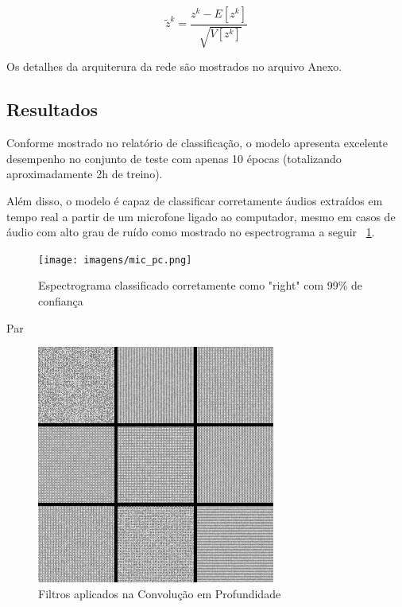 \documentclass{bmvc2k}
\begin{document}
\begin{equation}
\tilde z ^k = \frac{z^k - E[z^k]}{\sqrt[]{V[z^k]}}
\end{equation}

Os detalhes da arquiterura da rede são mostrados no arquivo Anexo.

\subsection*{Resultados}

Conforme mostrado no relatório de classificação, o modelo apresenta excelente
desempenho no conjunto de teste com apenas 10 épocas (totalizando
aproximadamente 2h de treino).

Além disso, o modelo é capaz de classificar corretamente áudios extraídos em
tempo real a partir de um microfone ligado ao computador, mesmo em casos
de áudio com alto grau de ruído como mostrado no espectrograma a seguir ~\ref{audio_mic}.

\begin{figure}[ht]
\centering
\texttt{[image: imagens/mic\_pc.png]} 
\caption{Espectrograma classificado corretamente como "right" com 99\% de confiança}
\label{audio_mic}
\end{figure}

Par

\begin{figure}[ht]
\centering
\includegraphics[scale=0.5]{imagens/stitched_filters_3x3.png} 
\caption{Filtros aplicados na Convolução em Profundidade}
\end{figure}

\newpage
\end{document}
